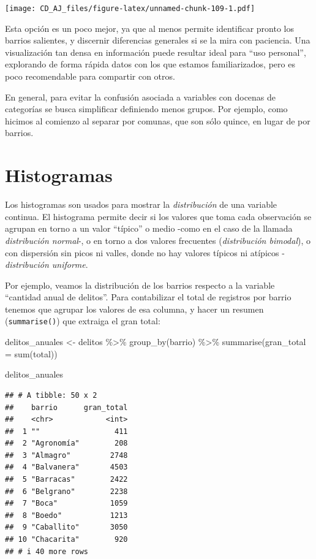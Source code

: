\documentclass[
]{book}
\newenvironment{Shaded}{\begin{snugshade}}{\end{snugshade}}
\newcommand{\AttributeTok}[1]{\textcolor[rgb]{0.77,0.63,0.00}{#1}}
\newcommand{\FunctionTok}[1]{\textcolor[rgb]{0.00,0.00,0.00}{#1}}
\newcommand{\NormalTok}[1]{#1}
\newcommand{\OtherTok}[1]{\textcolor[rgb]{0.56,0.35,0.01}{#1}}
\newcommand{\SpecialCharTok}[1]{\textcolor[rgb]{0.00,0.00,0.00}{#1}}
\begin{document}
\texttt{[image: CD\_AJ\_files/figure-latex/unnamed-chunk-109-1.pdf]}

Esta opción es un poco mejor, ya que al menos permite identificar pronto los barrios salientes, y discernir diferencias generales si se la mira con paciencia. Una visualización tan densa en información puede resultar ideal para ``uso personal'', explorando de forma rápida datos con los que estamos familiarizados, pero es poco recomendable para compartir con otros.

En general, para evitar la confusión asociada a variables con docenas de categorías se busca simplificar definiendo menos grupos. Por ejemplo, como hicimos al comienzo al separar por comunas, que son sólo quince, en lugar de por barrios.

\hypertarget{histogramas}{%
\section{Histogramas}\label{histogramas}}

Los histogramas son usados para mostrar la \emph{distribución} de una variable continua. El histograma permite decir si los valores que toma cada observación se agrupan en torno a un valor ``típico'' o medio -como en el caso de la llamada \emph{distribución normal}-, o en torno a dos valores frecuentes (\emph{distribución bimodal}), o con dispersión sin picos ni valles, donde no hay valores típicos ni atípicos - \emph{distribución uniforme}.

Por ejemplo, veamos la distribución de los barrios respecto a la variable ``cantidad anual de delitos''. Para contabilizar el total de registros por barrio tenemos que agrupar los valores de esa columna, y hacer un resumen (\texttt{summarise()}) que extraiga el gran total:

\begin{Shaded}
\begin{Highlighting}[]
\NormalTok{delitos\_anuales }\OtherTok{\textless{}{-}}\NormalTok{ delitos }\SpecialCharTok{\%\textgreater{}\%} 
    \FunctionTok{group\_by}\NormalTok{(barrio) }\SpecialCharTok{\%\textgreater{}\%} 
    \FunctionTok{summarise}\NormalTok{(}\AttributeTok{gran\_total =} \FunctionTok{sum}\NormalTok{(total))}

\NormalTok{delitos\_anuales}
\end{Highlighting}
\end{Shaded}

\begin{verbatim}
## # A tibble: 50 x 2
##    barrio      gran_total
##    <chr>            <int>
##  1 ""                 411
##  2 "Agronomía"        208
##  3 "Almagro"         2748
##  4 "Balvanera"       4503
##  5 "Barracas"        2422
##  6 "Belgrano"        2238
##  7 "Boca"            1059
##  8 "Boedo"           1213
##  9 "Caballito"       3050
## 10 "Chacarita"        920
## # i 40 more rows
\end{verbatim}
\end{document}
